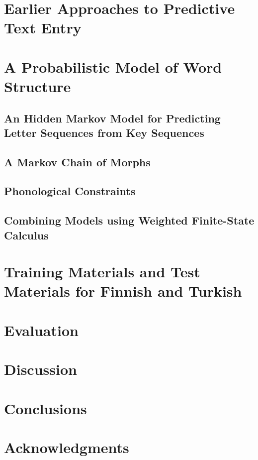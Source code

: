\documentclass{llncs}
\begin{document}
\section{Earlier Approaches to Predictive Text Entry}

\section{A Probabilistic Model of Word Structure}

\subsection{An Hidden Markov Model for Predicting Letter Sequences from Key Sequences}

\subsection{A Markov Chain of Morphs}

\subsection{Phonological Constraints}

\subsection{Combining Models using Weighted Finite-State Calculus}

\section{Training Materials and Test Materials for Finnish and Turkish}

\section{Evaluation}

\section{Discussion}

\section{Conclusions}

\section{Acknowledgments}



\end{document}
